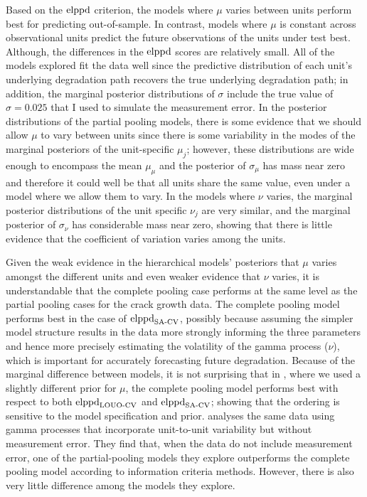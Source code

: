Based on the $\hbox{elppd}$ criterion, the models where $\mu$ varies between units perform best for predicting out-of-sample. In contrast, models where $\mu$ is constant across observational units predict the future observations of the units under test best. Although, the differences in the $\hbox{elppd}$ scores are relatively small. All of the models explored fit the data well since the predictive distribution of each unit's underlying degradation path recovers the true underlying degradation path; in addition, the marginal posterior distributions of $\sigma$ include the true value of $\sigma = 0.025$ that I used to simulate the measurement error. In the posterior distributions of the partial pooling models, there is some evidence that we should allow $\mu$ to vary between units since there is some variability in the modes of the marginal posteriors of the unit-specific $\mu_j$; however, these distributions are wide enough to encompass the mean $\mu_\mu$ and the posterior of $\sigma_\mu$ has mass near zero and therefore it could well be that all units share the same value, even under a model where we allow them to vary. In the models where $\nu$ varies, the marginal posterior distributions of the unit specific $\nu_j$ are very similar, and the marginal posterior of $\sigma_\nu$ has considerable mass near zero, showing that there is little evidence that the coefficient of variation varies among the units.

Given the weak evidence in the hierarchical models' posteriors that $\mu$ varies amongst the different units and even weaker evidence that $\nu$ varies, it is understandable that the complete pooling case performs at the same level as the partial pooling cases for the crack growth data. The complete pooling model performs best in the case of $\hbox{elppd}_\text{SA-CV}$, possibly because assuming the simpler model structure results in the data more strongly informing the three parameters and hence more precisely estimating the volatility of the gamma process ($\nu$), which is important for accurately forecasting future degradation. Because of the marginal difference between models, it is not surprising that in \citet{leadbetter2024}, where we used a slightly different prior for $\mu$, the complete pooling model performs best with respect to both $\hbox{elppd}_\text{LOUO-CV}$ and $\hbox{elppd}_\text{SA-CV}$; showing that the ordering is sensitive to the model specification and prior. \citet{rodriguez-picon2018} analyses the same data using gamma processes that incorporate unit-to-unit variability but without measurement error. They find that, when the data do not include measurement error, one of the partial-pooling models they explore outperforms the complete pooling model according to information criteria methods. However, there is also very little difference among the models they explore.

